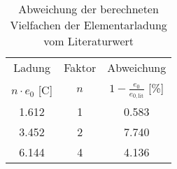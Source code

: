 \begin{table}[!h]
	\centering
	\begin{tabular}{|c|c|c|}
		\hline
		Ladung & Faktor & Abweichung\\
		$n\cdot e_{0}$ [\si{\coulomb}] & $n$ & $1-\frac{e_0}{e_{0,\text{lit}}}$ [\si{\percent}]\\
\hline\hline
		\num{1.612} & \num{1} & \num{0.583}\\
		\num{3.452} & \num{2} & \num{7.740}\\
		\num{6.144} & \num{4} & \num{4.136}\\
		\hline
	\end{tabular}
	\caption{Abweichung der berechneten Vielfachen der Elementarladung vom Literaturwert \label{tab:Auswertung_Ladung}}
\end{table}
